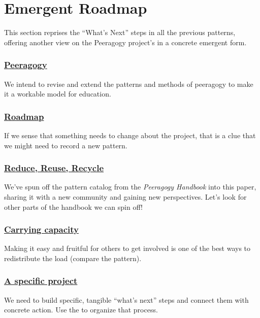 \section{Emergent Roadmap} \label{sec:Distributed_Roadmap}

This section reprises the ``What's Next'' steps in all the previous
patterns, offering another view on the Peeragogy project's
 in a concrete emergent form.

\subsubsection*{\hyperref[sec:Peeragogy_Project]{Peeragogy}} 
 We intend to revise and extend the patterns and methods of peeragogy to make it a workable model for education.

\subsubsection*{\hyperref[sec:Roadmap]{Roadmap}} If we sense that something needs to change about the project, that is a clue that we might need to record a new pattern.

\subsubsection*{\hyperref[sec:Use_or_make]{Reduce, Reuse, Recycle}}
We've spun off the pattern catalog from the \emph{Peeragogy Handbook} into this paper, sharing it with a new community and gaining new perspectives.  Let's look for other parts of the handbook we can spin off!

\subsubsection*{\hyperref[sec:Carrying_capacity]{Carrying capacity}} 
Making it easy and fruitful for others to get involved is one of the best ways to
redistribute the load (compare the
pattern).

\subsubsection*{\hyperref[sec:A_specific_project]{A specific project}}
We need to build specific, tangible ``what's next'' steps and connect them with concrete action. Use the  to organize that process. 

